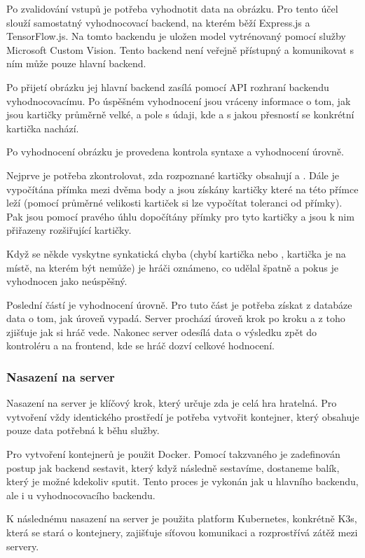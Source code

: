Po zvalidování vstupů je potřeba vyhodnotit data na obrázku. Pro tento účel slouží samostatný vyhodnocovací backend, na kterém běží Express.js a TensorFlow.js. Na tomto backendu je uložen model vytrénovaný pomocí služby Microsoft Custom Vision. Tento backend není veřejně přístupný a komunikovat s ním může pouze hlavní backend.\par
Po přijetí obrázku jej hlavní backend zasílá pomocí API rozhraní backendu vyhodnocovacímu. Po úspěšném vyhodnocení jsou vráceny informace o tom, jak jsou kartičky průměrně velké, a pole s údaji, kde a s jakou přesností se konkrétní kartička nachází.

Po vyhodnocení obrázku je provedena kontrola syntaxe a vyhodnocení úrovně.\par
Nejprve je potřeba zkontrolovat, zda rozpoznané kartičky obsahují  a . Dále je vypočítána přímka mezi dvěma body a jsou získány kartičky které na této přímce leží (pomocí průměrné velikosti kartiček si lze vypočítat toleranci od přímky). Pak jsou pomocí pravého úhlu dopočítány přímky pro tyto kartičky a jsou k nim přiřazeny rozšiřující kartičky.\par
Když se někde vyskytne synkatická chyba (chybí kartička  nebo , kartička je na místě, na kterém být nemůže) je hráči oznámeno, co udělal špatně a pokus je vyhodnocen jako neúspěšný.\par
Poslední částí je vyhodnocení úrovně. Pro tuto část je potřeba získat z databáze data o tom, jak úroveň vypadá. Server prochází úroveň krok po kroku a z toho zjišťuje jak si hráč vede. Nakonec server odesílá data o výsledku zpět do kontroléru a na frontend, kde se hráč dozví celkové hodnocení.

\subsubsection{Nasazení na server}
Nasazení na server je klíčový krok, který určuje zda je celá hra hratelná.
Pro vytvoření vždy identického prostředí je potřeba vytvořit kontejner, který obsahuje pouze data potřebná k běhu služby.\par
Pro vytvoření kontejnerů je použit Docker. Pomocí takzvaného  je zadefinován postup jak backend sestavit, který když následně sestavíme, dostaneme balík, který je možné kdekoliv sputit. Tento proces je vykonán jak u hlavního backendu, ale i u vyhodnocovacího backendu.\par
K následnému nasazení na server je použita platform Kubernetes, konkrétně K3s, která se stará o kontejnery, zajišťuje síťovou komunikaci a rozprostřívá zátěž mezi servery.
